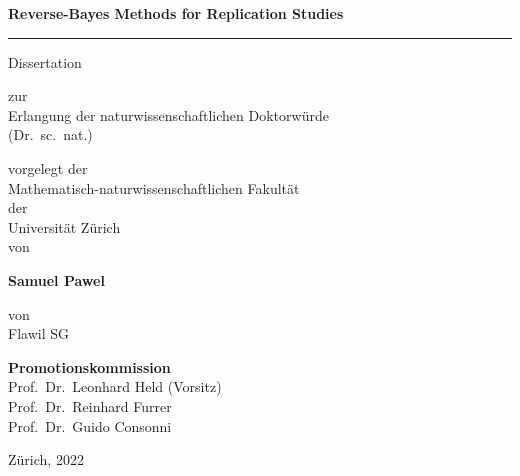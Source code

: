 \documentclass[fontsize=14pt]{scrreprt}
\begin{document}
\begin{titlepage}
\enlargethispage{\baselineskip}
\centering

{\sffamily
{\Large \textbf{Reverse-Bayes Methods for Replication Studies }}

\vspace*{1.5cm}
\hrule
\vspace*{1.5cm}

{\large\sffamily Dissertation}

\vspace*{1cm}

zur\\
Erlangung der naturwissenschaftlichen Doktorwürde\\
(Dr.~sc.~nat.)

\vspace*{1cm}

vorgelegt der\\
Mathematisch-naturwissenschaftlichen Fakultät\\
der\\
Universität Zürich\\[1em]

von

\vspace*{1em}
{\large\sffamily \textbf{Samuel Pawel}}
\vspace*{1em}

von\\
Flawil SG

\vspace*{1.5cm}

{\bfseries\sffamily Promotionskommission}\\[1ex]
Prof.~Dr.~Leonhard Held (Vorsitz)\\
Prof.~Dr.~Reinhard Furrer\\
Prof.~Dr.~Guido Consonni

\vspace*{1.5cm}

Zürich, 2022
}
\end{titlepage}
\end{document}
